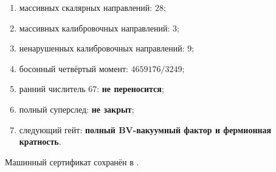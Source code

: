 \begin{protocol}
\begin{enumerate}
 \item массивных скалярных направлений: \textbf{$28$};
 \item массивных калибровочных направлений: \textbf{$3$};
 \item ненарушенных калибровочных направлений: \textbf{$9$};
 \item босонный четвёртый момент: \textbf{$4659176/3249$};
 \item ранний числитель $67$: \textbf{не переносится};
 \item полный суперслед: \textbf{не закрыт};
 \item следующий гейт: \textbf{полный BV-вакуумный фактор и фермионная кратность}.
\end{enumerate}
\end{protocol}

Машинный сертификат сохранён в
.